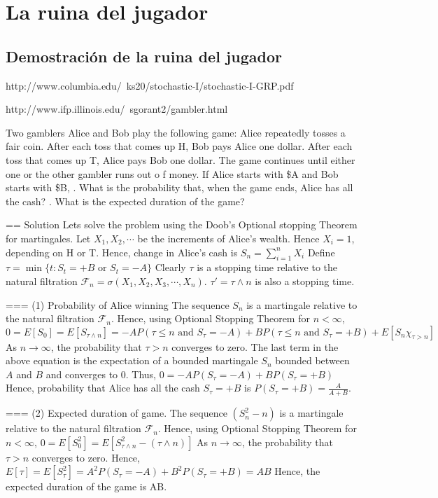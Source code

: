 \chapter{La ruina del jugador}\label{chap:manual}

\section{Demostración de la ruina del jugador}
http://www.columbia.edu/~ks20/stochastic-I/stochastic-I-GRP.pdf


http://www.ifp.illinois.edu/~sgorant2/gambler.html


Two gamblers Alice and Bob play the following game: Alice repeatedly tosses a fair coin. 
After each toss that comes up H, Bob pays Alice one dollar. After each toss that comes up T, 
Alice pays Bob one dollar. The game continues until either one or the other gambler runs out o
f money. If Alice starts with \$A and Bob starts with \$B,
. What is the probability that, when the game ends, Alice has all the cash?
. What is the expected duration of the game?
 
== Solution
Lets solve the problem using the Doob's Optional stopping Theorem for martingales.
Let $X_1,X_2,\cdots$ be the increments of Alice's wealth. Hence $X_i= 1$, depending on H or T. 
Hence, change in Alice's cash is
\( 
S_n = \sum_{i=1}^n X_i 
\)
Define  
\(
\tau = \min\{t: S_t = +B \mbox{ or } S_t = -A \}
\)
Clearly $\tau$ is a stopping time relative to the natural filtration
$\mathcal{F}_n = \sigma(X_1,X_2,X_3,\cdots,X_n)$. 
$\tau' = \tau \wedge n$ is also a stopping time.

=== (1) Probability of Alice winning
The sequence $S_n$ is a martingale relative to the natural filtration $\mathcal{F}_n$. 
Hence, using Optional Stopping Theorem for $n < \infty$,
\( 
 0 = {E}[S_0] = {E}[S_{\tau \wedge n}] = -A P(\tau \leq n \mbox{ and } S_{\tau} = -A) + B P(\tau \leq n \mbox{ and } S_{\tau} = +B) + E[S_n \chi_{\tau > n}]
 \)                                               
 As $n \to \infty$, the probability that  $\tau > n$ converges to zero. 
 The last term in the above equation is the expectation of a bounded martingale $S_n$
 bounded between $A$ and $B$ and converges to 0. Thus,
 \(
  0 = - A P(S_{\tau} = -A) + B P(S_{\tau} = +B) 
 \)
 Hence, probability that Alice has all the cash $S_{\tau} = +B$ is
 \(
 P(S_{\tau} = +B) = \frac{A}{A+B}.
 \)
 
=== (2) Expected duration of game.
The sequence $(S_n^2-n)$ is a martingale relative to the natural filtration $\mathcal{F}_n$.
Hence, using Optional Stopping Theorem for $n < \infty$,
\( 
 0 = {E}[S^2_0] = {E}[S_{\tau \wedge n}^2 - (\tau \wedge n)]
 \)                                                                                                          
 As $n \to \infty$, the probability that  $\tau > n$ converges to zero. 
Hence,
\(
E[\tau] = E[S_{\tau}^2] = A^2  P(S_{\tau} = -A) + B^2  P(S_{\tau} = +B) = AB 
\)                               
Hence, the expected duration of the game is AB.


